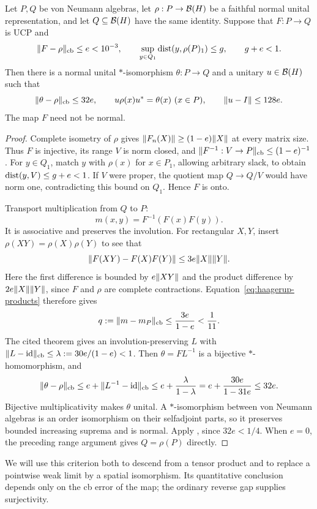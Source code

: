 \begin{proposition}\label{prop:ucp}
Let $P,Q$ be von Neumann algebras, let
$\rho:P\to\mathcal B(H)$ be a faithful normal unital representation, and let
$Q\subseteq\mathcal B(H)$ have the same identity. Suppose that $F:P\to Q$ is
UCP and
\[
 \lVert F-\rho\rVert_{\mathrm{cb}}\le e<10^{-3},\qquad
 \sup_{y\in Q_1}\operatorname{dist}(y,\rho(P)_1)\le g,\qquad g+e<1.
\]
Then there is a normal unital $*$-isomorphism $\theta:P\to Q$ and a
unitary $u\in\mathcal B(H)$ such that
\[
 \lVert\theta-\rho\rVert_{\mathrm{cb}}\le32e,\qquad
 u\rho(x)u^*=\theta(x)\ (x\in P),\qquad \lVert u-I\rVert\le128e.
\]
The map $F$ need not be normal.
\end{proposition}

\begin{proof}
Complete isometry of $\rho$ gives
$\lVert F_n(X)\rVert\ge(1-e)\lVert X\rVert$ at every matrix size. Thus $F$ is
injective, its range $V$ is norm closed, and
$\lVert F^{-1}:V\to P\rVert_{\mathrm{cb}}\le(1-e)^{-1}$.
For $y\in Q_1$, match $y$ with $\rho(x)$ for $x\in P_1$, allowing
arbitrary slack, to obtain $\operatorname{dist}(y,V)\le g+e<1$.
If $V$ were proper, the quotient map $Q\to Q/V$ would have norm one,
contradicting this bound on $Q_1$. Hence $F$ is onto.

Transport multiplication from $Q$ to $P$:
\[
 m(x,y)=F^{-1}(F(x)F(y)).
\]
It is associative and preserves the involution. For rectangular $X,Y$,
insert $\rho(XY)=\rho(X)\rho(Y)$ to see that
\[
 \lVert F(XY)-F(X)F(Y)\rVert\le3e\lVert X\rVert\lVert Y\rVert.
\]
Here the first difference is bounded by $e\lVert XY\rVert$ and the product
difference by $2e\lVert X\rVert\lVert Y\rVert$, since $F$ and $\rho$ are complete
contractions. Equation~\eqref{eq:haagerup-products} therefore gives
\[
 q:=\lVert m-m_P\rVert_{\mathrm{cb}}\le\frac{3e}{1-e}<\frac1{11}.
\]
The cited theorem gives an involution-preserving $L$ with
$\lVert L-\operatorname{id}\rVert_{\mathrm{cb}}\le\lambda:=30e/(1-e)<1$.
Then $\theta=FL^{-1}$ is a bijective $*$-homomorphism, and
\[
 \lVert\theta-\rho\rVert_{\mathrm{cb}}
 \le e+\lVert L^{-1}-\operatorname{id}\rVert_{\mathrm{cb}}
 \le e+\frac{\lambda}{1-\lambda}
 = e+\frac{30e}{1-31e}\le32e.
\]
Bijective multiplicativity makes $\theta$ unital. A $*$-isomorphism
between von Neumann algebras is an order isomorphism on their
selfadjoint parts, so it preserves bounded increasing suprema and is
normal. Apply , since $32e<1/4$.
When $e=0$, the preceding range argument gives $Q=\rho(P)$ directly.
\end{proof}

We will use this criterion both to descend from a tensor product and
to replace a pointwise weak limit by a spatial isomorphism. Its
quantitative conclusion depends only on the cb error of the map;
the ordinary reverse gap supplies surjectivity.

